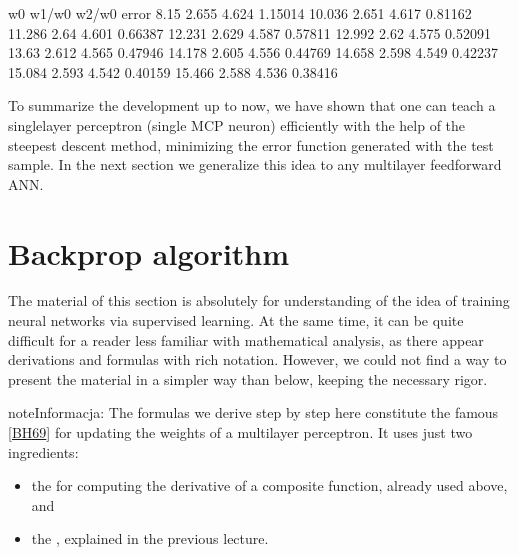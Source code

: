 \documentclass[a4paper,12pt,polish]{jupyterBook}
\begin{document}
\begin{sphinxVerbatimOutput}

\begin{sphinxVerbatim}[commandchars=\\\{\}]
   w0   w1/w0  w2/w0 error
\PYGZhy{}8.15 2.655 \PYGZhy{}4.624 1.15014
\PYGZhy{}10.036 2.651 \PYGZhy{}4.617 0.81162
\PYGZhy{}11.286 2.64 \PYGZhy{}4.601 0.66387
\PYGZhy{}12.231 2.629 \PYGZhy{}4.587 0.57811
\PYGZhy{}12.992 2.62 \PYGZhy{}4.575 0.52091
\PYGZhy{}13.63 2.612 \PYGZhy{}4.565 0.47946
\PYGZhy{}14.178 2.605 \PYGZhy{}4.556 0.44769
\PYGZhy{}14.658 2.598 \PYGZhy{}4.549 0.42237
\PYGZhy{}15.084 2.593 \PYGZhy{}4.542 0.40159
\PYGZhy{}15.466 2.588 \PYGZhy{}4.536 0.38416
\end{sphinxVerbatim}
\end{sphinxVerbatimOutput}

\sphinxAtStartPar
To summarize the development up to now, we have shown that one can teach a single\sphinxhyphen{}layer perceptron (single MCP neuron) efficiently with the help of the steepest descent method, minimizing the error function generated with the test sample. In the next section we generalize this idea to any multi\sphinxhyphen{}layer feed\sphinxhyphen{}forward ANN.


\section{Backprop algorithm}
\label{\detokenize{docs/backprop:backprop-algorithm}}\label{\detokenize{docs/backprop:bpa-lab}}
\sphinxAtStartPar
The material of this section is absolutely  for understanding of the idea of training neural networks via supervised learning. At the same time, it can be quite difficult for a reader less familiar with mathematical analysis, as there appear derivations and formulas with rich notation. However, we could not find a way to present the material in a simpler way than below, keeping the necessary rigor.

\begin{sphinxadmonition}{note}{Informacja:}
\sphinxAtStartPar
The formulas we derive step by step here constitute the famous  {[}\hyperlink{cite.docs/conclusion:id12}{BH69}{]} for updating the weights of a multi\sphinxhyphen{}layer perceptron. It uses just two ingredients:
\begin{itemize}
\item {} 
\sphinxAtStartPar
the  for computing the derivative of a composite function, already used above, and

\item {} 
\sphinxAtStartPar
the , explained in the previous lecture.

\end{itemize}
\end{sphinxadmonition}
\end{document}
